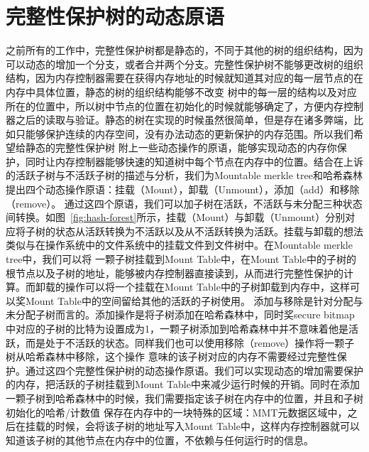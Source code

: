 \section{完整性保护树的动态原语}
之前所有的工作中，完整性保护树都是静态的，不同于其他的树的组织结构，因为可以动态的增加一个分支，或者合并两个分支。完整性保护树不能够更改树的组织结构，因为内存控制器需要在获得内存地址的时候就知道其对应的每一层节点的在内存中具体位置，静态的树的组织结构能够不改变
树中的每一层的结构以及对应所在的位置中，所以树中节点的位置在初始化的时候就能够确定了，方便内存控制器之后的读取与验证。静态的树在实现的时候虽然很简单，但是存在诸多弊端，比如只能够保护连续的内存空间，没有办法动态的更新保护的内存范围。所以我们希望给静态的完整性保护树
附上一些动态操作的原语，能够实现动态的内存你保护，同时让内存控制器能够快速的知道树中每个节点在内存中的位置。结合在上诉的活跃子树与不活跃子树的描述与分析，我们为Mountable merkle tree和哈希森林提出四个动态操作原语：挂载（Mount），卸载（Unmount），添加（add）和移除（remove）。
通过这四个原语，我们可以加子树在活跃，不活跃与未分配三种状态间转换。如图~\ref{fig:hash-forest}所示，挂载（Mount）与卸载（Unmount）分别对应将子树的状态从活跃转换为不活跃以及从不活跃转换为活跃。挂载与卸载的想法类似与在操作系统中的文件系统中的挂载文件到文件树中。在Mountable merkle tree中，我们可以将
一颗子树挂载到Mount Table中，在Mount Table中的子树的根节点以及子树的地址，能够被内存控制器直接读到，从而进行完整性保护的计算。而卸载的操作可以将一个挂载在Mount Table中的子树卸载到内存中，这样可以奖Mount Table中的空间留给其他的活跃的子树使用。
添加与移除是针对分配与未分配子树而言的。添加操作是将子树添加在哈希森林中，同时奖secure bitmap中对应的子树的比特为设置成为1，一颗子树添加到哈希森林中并不意味着他是活跃，而是处于不活跃的状态。同样我们也可以使用移除（remove）操作将一颗子树从哈希森林中移除，这个操作
意味的该子树对应的内存不需要经过完整性保护。通过这四个完整性保护树的动态操作原语。我们可以实现动态的增加需要保护的内存，把活跃的子树挂载到Mount  Table中来减少运行时候的开销。同时在添加一颗子树到哈希森林中的时候，我们需要指定该子树在内存中的位置，并且和子树初始化的哈希/计数值
保存在内存中的一块特殊的区域：MMT元数据区域中，之后在挂载的时候，会将该子树的地址写入Mount Table中，这样内存控制器就可以知道该子树的其他节点在内存中的位置，不依赖与任何运行时的信息。

